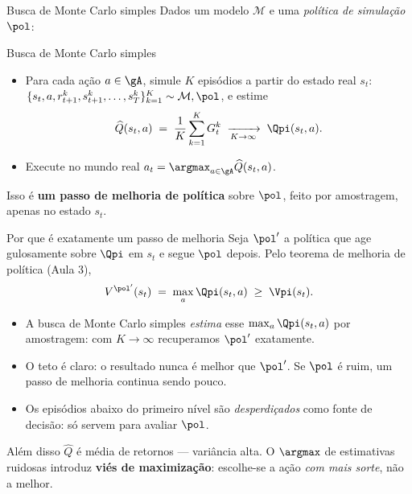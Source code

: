 \documentclass[aspectratio=169, 11pt]{beamer}
\newcommand{\Mmod}{\mathcal{M}}                 %
\newcommand{\Qh}{\widehat{Q}}                   %
\newcommand{\ret}{G}                            %
\begin{document}
\begin{frame}{Busca de Monte Carlo simples}
  Dados um modelo $\Mmod$ e uma \emph{política de simulação} $\pol$:

  \begin{algbox}{Busca de Monte Carlo simples}
    \begin{itemize}\setlength{\itemsep}{0.1ex}
      \item Para cada ação $a \in \gA$, simule $K$ episódios a partir do estado
            real $s_t$:
            $\{s_t, a, r^k_{t+1}, s^k_{t+1}, \dots, s^k_T\}_{k=1}^{K}
             \sim \Mmod, \pol$, e estime
            \[
              \Qh(s_t,a) \;=\; \frac{1}{K}\sum_{k=1}^{K} \ret^k_t
              \;\xrightarrow[K\to\infty]{}\; \Qpi(s_t,a).
            \]
      \item Execute no mundo real $\displaystyle a_t = \argmax_{a\in\gA} \Qh(s_t,a)$.
    \end{itemize}
  \end{algbox}

  \pause
  \begin{ideiabox}
    Isso é \textbf{um passo de melhoria de política} sobre $\pol$, feito por
    amostragem, apenas no estado $s_t$.
  \end{ideiabox}
\end{frame}

\begin{frame}{Por que é exatamente um passo de melhoria}
  Seja $\pol'$ a política que age gulosamente sobre $\Qpi$ em $s_t$ e segue
  $\pol$ depois. Pelo teorema de melhoria de política (Aula 3),
  \[
    V^{\pol'}(s_t) \;=\; \max_{a} \Qpi(s_t,a) \;\ge\; \Vpi(s_t).
  \]

  \pause
  \begin{itemize}
    \item A busca de Monte Carlo simples \emph{estima} esse $\max_a \Qpi(s_t,a)$
          por amostragem: com $K\to\infty$ recuperamos $\pol'$ exatamente.
    \item O teto é claro: o resultado nunca é melhor que $\pol'$. Se $\pol$
          é ruim, um passo de melhoria continua sendo pouco.
    \item Os episódios abaixo do primeiro nível são \emph{desperdiçados} como
          fonte de decisão: só servem para avaliar $\pol$.
  \end{itemize}

  \pause
  \begin{alertabox}
    Além disso $\Qh$ é média de retornos --- variância alta. O $\argmax$ de
    estimativas ruidosas introduz \textbf{viés de maximização}: escolhe-se a
    ação \emph{com mais sorte}, não a melhor.
  \end{alertabox}
\end{frame}
\end{document}
